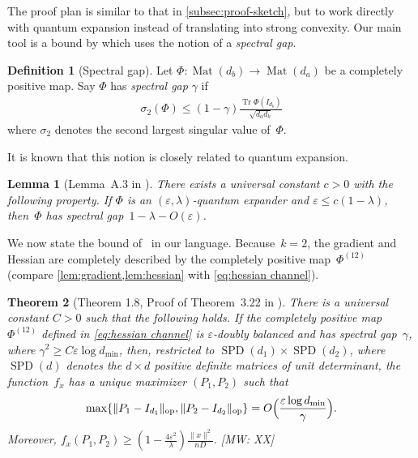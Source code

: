 \documentclass[aos]{imsart}
\newtheorem{theorem}{Theorem}[section]
\newtheorem{lemma}[theorem]{Lemma}
\theoremstyle{definition}
\newtheorem*{definition}{Definition}
\numberwithin{equation}{section}
\DeclareMathOperator{\op}{op}
\DeclareMathOperator{\Mat}{Mat}
\DeclareMathOperator{\tr}{Tr}
\DeclareMathOperator{\SSPD}{SPD}
\DeclarePairedDelimiter{\norm}{\lVert}{\rVert}
\newcommand{\eps}{\varepsilon}
\newcommand{\MW}[1]{{\color{red}[MW: #1]}}
\begin{document}
The proof plan is similar to that in \cref{subsec:proof-sketch}, but to work directly with quantum expansion instead of translating into strong convexity.
Our main tool is a bound by \cite{KLR19} which uses the notion of a \emph{spectral gap}.

\begin{definition}[Spectral gap]
Let $\Phi\colon\Mat(d_b) \to \Mat(d_a)$ be a completely positive map.
Say $\Phi$ has \emph{spectral gap} $\gamma$ if
\begin{align}\label{eq:spectral-gap}
  \sigma_2(\Phi) \leq (1 - \gamma) \frac{\tr \Phi(I_{d_b})}{\sqrt{d_a d_b}}
\end{align}
where $\sigma_2$ denotes the second largest singular value of~$\Phi$.
\end{definition}

It is known that this notion is closely related to quantum expansion.

\begin{lemma}[Lemma~A.3 in \cite{FM20}]\label{lem:fm20}
There exists a universal constant $c>0$ with the following property.
If $\Phi$ is an $(\eps,\lambda)$-quantum expander and $\eps \leq c(1-\lambda)$, then~$\Phi$ has spectral gap~$1-\lambda-O(\eps)$.
\end{lemma}

We now state the bound of~\cite{KLR19} in our language.
Because~$k = 2$, the gradient and Hessian are completely described by the completely positive map~$\Phi^{(12)}$ (compare \cref{lem:gradient,lem:hessian} with \cref{eq:hessian channel}).

\begin{theorem}[Theorem 1.8, Proof of Theorem~3.22 in \cite{KLR19}]\label{thm:klr}
There is a universal constant $C>0$ such that the following holds.
If the completely positive map $\Phi^{(12)}$ defined in \cref{eq:hessian channel} is $\eps$-doubly balanced and has spectral gap~$\gamma$, where $\gamma^2 \geq C \eps \log d_{\min}$, then, restricted to $\SSPD(d_1) \times \SSPD(d_2)$, where $\SSPD(d)$ denotes the $d\times d$ positive definite matrices of unit determinant, the function~$f_x$ has a unique maximizer $(P_1,P_2)$ such that
\begin{align*}
  \max \{ \norm{P_1 - I_{d_1}}_{\op}, \norm{P_2 - I_{d_2}}_{\op} \} = O\Bigl(\frac{\eps \log d_{\min}}\gamma\Bigr).
\end{align*}
Moreover, $f_x(P_1, P_2) \geq (1 - \frac{4 \eps^2}{\lambda}) \frac{\|x\|^2}{nD}$. \MW{XX}
\end{theorem}
\end{document}
